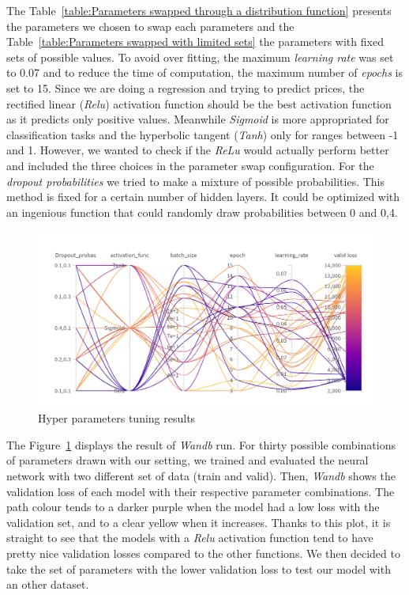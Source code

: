 \documentclass[12pt]{article}
\begin{document}
\noindent The Table~\ref{table:Parameters swapped through a distribution function} presents the parameters we chosen to swap each parameters and the Table~\ref{table:Parameters swapped with limited sets} the parameters with fixed sets of possible values. 
To avoid over fitting, the maximum \textit{learning rate} was set to 0.07 and to reduce the time of computation, the maximum number of \textit{epochs} is set to 15. Since we are doing a regression and trying to predict prices, the rectified linear (\textit{Relu}) activation function should be the best activation function as it predicts only positive values. Meanwhile \textit{Sigmoid} is more appropriated for classification tasks and the hyperbolic tangent (\textit{Tanh}) only for ranges between -1 and 1. However, we wanted to check if the \textit{ReLu} would actually perform better and included the three choices in the parameter swap configuration.
\noindent For the \textit{dropout probabilities} we tried to make a mixture of possible probabilities. This method is fixed for a certain number of hidden layers. It could be optimized with an ingenious function that could randomly draw probabilities between 0 and 0,4.



\FloatBarrier
\begin{figure}[ht]
    \centering
    \includegraphics[width=1\textwidth]{wandbrun_1.png}
    \caption{Hyper parameters tuning results}
    \label{table:Hyper parameters tuning results MLP}
\end{figure}
\FloatBarrier

\noindent The Figure~\ref{table:Hyper parameters tuning results MLP} displays the result of \textit{Wandb} run. For thirty possible combinations of parameters drawn with our setting, we trained and evaluated the neural network with two different set of data (train and valid). Then, \textit{Wandb} shows the validation loss of each model with their respective parameter combinations. The path colour tends to a darker purple when the model had a low loss with the validation set, and to a clear yellow when it increases.
Thanks to this plot, it is straight to see that the models with a \textit{Relu} activation function tend to have pretty nice validation losses compared to the other functions.
We then decided to take the set of parameters with the lower validation loss to test our model with an other dataset. 
\end{document}
